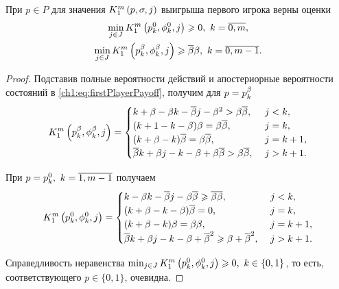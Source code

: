 {\begin{proposition}
  \label{ch1:prop:K1-base}
  При $p \in P$ для значения $\firstPlayerPayoff{1}{p}{\sigma}{j}$ выигрыша первого игрока верны оценки
  \begin{equation}
    \label{ch1:eq:lowerBound:inequalities}
    \begin{gathered}
      \min_{j \in J}
      \firstPlayerPayoff{1}{\pEven}{\fEven}{j} \geq 0,\ k = \overline{0, m}, \\
      \min_{j \in J}
      \firstPlayerPayoff{1}{\pOdd}{\fOdd}{j} \geq \DCo\Co,\ k = \overline{0, m-1}.
    \end{gathered}
  \end{equation}
\end{proposition}
\begin{proof}
  Подставив полные вероятности действий и апостериорные вероятности состояний в \eqref{ch1:eq:firstPlayerPayoff}, получим для $p = \pOdd[k]$
  \begin{equation*}
    \firstPlayerPayoff{1}{\pOdd}{\fOdd}{j} = \begin{cases}
      k + \Co - \Co k - \DCo j - \Co^2 > \Co \DCo,\ & j < k,\\
      (k + 1 - k - \Co) \Co = \Co \DCo,\ & j = k,\\
      (k + \Co - k) \DCo = \Co \DCo,\ & j = k+1,\\
      \DCo k + \Co j - k - \Co + \Co \DCo > \Co \DCo,\ & j > k+1.
    \end{cases}
  \end{equation*}
  
  При $p = \pEven,\ k = \overline{1, m-1}$ получаем
  \begin{equation*}
    \firstPlayerPayoff{1}{\pEven}{\fEven}{j} = \begin{cases}
      k - \Co k - \DCo j - \Co \DCo \geq \DCo \DCo,\ & j < k,\\
      (k + \Co - k - \Co) \DCo = 0,\ & j = k,\\
      (k + \Co - k) \Co = \Co \Co,\ & j = k+1,\\
      \DCo k + \Co j - k - \Co + \DCo^2 \geq \Co + \DCo^2,\ & j > k+1.
    \end{cases}
  \end{equation*}

  Справедливость неравенства $\min_{j \in J} \firstPlayerPayoff{1}{\pEven}{\fEven}{j} \geq 0,\ k \in \{0, 1\}$, то есть, соответствующего $p \in \{0, 1\}$, очевидна.
\end{proof}

}
